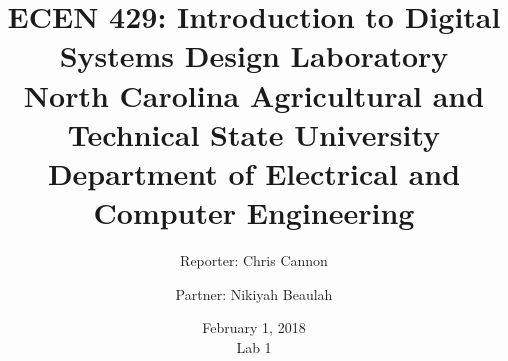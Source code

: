 \documentclass[11pt]{report}
\title {ECEN 429: Introduction to Digital Systems Design Laboratory \\ North Carolina Agricultural and Technical State University \\ Department of Electrical and Computer Engineering} %
\author{Reporter: Chris Cannon \\ \and Partner: Nikiyah Beaulah} %
\date{February 1, 2018 \\ Lab 1}
\begin{document}
\maketitle %

\begin{center}
\end{center}
\end{document}

